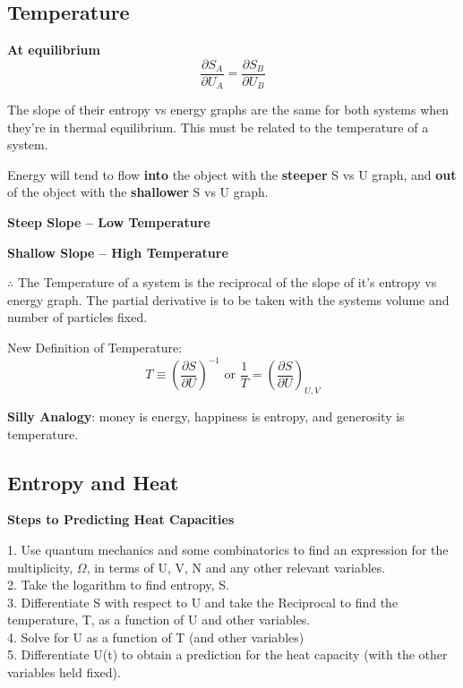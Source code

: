 \def \secname {}

\section[\secname]{\hyperlink{toc}{\secname}}




\subsection{Temperature}

\textbf{At equilibrium}
\begin{equation}
\frac{\partial S_A}{\partial U_A} = \frac{\partial S_B}{\partial U_B}
\end{equation}

The slope of their entropy vs energy graphs are the same for both systems when they're in thermal equilibrium. This must be related to the temperature of a system.

Energy will tend to flow \textbf{into} the object with the \textbf{steeper} S vs U graph, and \textbf{out} of the object with the \textbf{shallower} S vs U graph.

\textbf{Steep Slope -- Low Temperature}

\textbf{Shallow Slope -- High Temperature}

$\therefore$ The Temperature of a system is the reciprocal of the slope of it's entropy vs energy graph. The partial derivative is to be taken with the systems volume and number of particles fixed.
\begin{shaded}
New Definition of Temperature:
\begin{equation}
    T \equiv \left( \frac{\partial S}{\partial U} \right)^{-1} \text{   or   } \frac{1}{T} = \left(\frac{\partial S}{\partial U}\right)_{U, V}
\end{equation}
\end{shaded}

\textbf{Silly Analogy}: money is energy, happiness is entropy, and generosity is temperature.

\subsection{Entropy and Heat}

\textbf{Steps to Predicting Heat Capacities}

1. Use quantum mechanics and some combinatorics to find an expression for the multiplicity, $\Omega$, in terms of U, V, N and any other relevant variables.\\
2. Take the logarithm to find entropy, S.\\
3. Differentiate S with respect to U and take the Reciprocal to find the temperature, T, as a function of U and other variables.\\
4. Solve for U as a function of T (and other variables)\\
5. Differentiate U(t) to obtain a prediction for the heat capacity (with the other variables held fixed).

